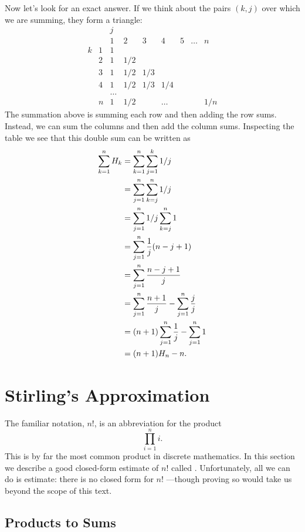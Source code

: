 Now let's look for an exact answer.  If we think about the pairs
$(k,j)$ over which we are summing, they form a triangle:
\[
\begin{array}{cc|ccccccc}
 &  & j &   &   &   &   &       &   \\
 &  & 1 & 2 & 3 & 4 & 5 & \dots & n \\
\hline
k & 1 & 1\\
  & 2 &1&1/2\\
  & 3 &1&1/2&1/3\\
  & 4 &1&1/2&1/3&1/4\\
  &   &\dots\\
  & n &1&1/2&&\dots&&&1/n
\end{array}
\]
The summation above is summing each row and then adding the row sums.
Instead, we can sum the columns and then add the column sums.
Inspecting the table we see that this double sum can be written as
\begin{align}
\sum_{k=1}^n H_k &= \sum_{k=1}^n \sum_{j=1}^k 1/j\notag\\
&= \sum_{j=1}^n \sum_{k=j}^n 1/j\notag\\
&= \sum_{j=1}^n 1/j \sum_{k=j}^n 1\notag\\
&= \sum_{j=1}^n \frac1j (n-j+1)\notag\\
&= \sum_{j=1}^n \frac{n-j+1}j \notag\\
&= \sum_{j=1}^n \frac{n+1}j - \sum_{j=1}^n \frac{j}{j}\notag\\
&= (n+1)\sum_{j=1}^n \frac1j - \sum_{j=1}^n 1\notag\\
&= (n+1)H_n-n.\label{sHk}
\end{align}

\section{Stirling's Approximation}\label{Stirling_sec}

The familiar  notation, $n!$, is an abbreviation for the
product
\[
\prod_{i=1}^n i.
\]
This is by far the most common product in discrete mathematics.  In this
section we describe a good closed-form estimate of $n!$ called
.  Unfortunately, all we can do is
estimate: there is no closed form for $n!$ ---though proving so would take
us beyond the scope of this text.

\subsection{Products to Sums}


